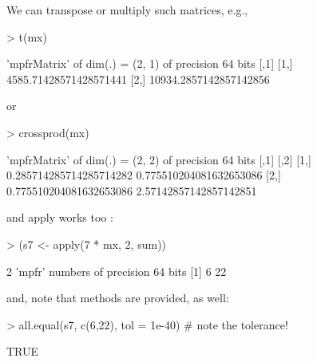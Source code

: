 \begin{frame}[fragile]%
We can transpose or multiply such matrices, e.g.,
\begin{Schunk}
\begin{Sinput}
> t(mx) %*% 10^(1:4)
\end{Sinput}
\begin{Soutput}
'mpfrMatrix' of dim(.) =  (2, 1) of precision  64   bits 
     [,1]                  
[1,] 4585.71428571428571441
[2,] 10934.2857142857142856
\end{Soutput}
\end{Schunk}
or
\begin{Schunk}
\begin{Sinput}
> crossprod(mx)
\end{Sinput}
\begin{Soutput}
'mpfrMatrix' of dim(.) =  (2, 2) of precision  64   bits 
     [,1]                    [,2]                   
[1,] 0.285714285714285714282 0.775510204081632653086
[2,] 0.775510204081632653086  2.57142857142857142851
\end{Soutput}
\end{Schunk}

\pause
\medskip

and apply works too :
\begin{Schunk}
\begin{Sinput}
> (s7 <- apply(7 * mx, 2, sum))
\end{Sinput}
\begin{Soutput}
2 'mpfr' numbers of precision  64   bits 
[1]  6 22
\end{Soutput}
\end{Schunk}
\smallskip

and, note that  methods are provided, as well:
\begin{Schunk}
\begin{Sinput}
> all.equal(s7, c(6,22), tol = 1e-40) # note the tolerance!
\end{Sinput}
\begin{Soutput}
[1] TRUE
\end{Soutput}
\end{Schunk}
\end{frame}


